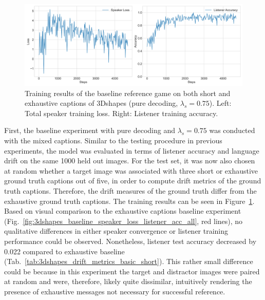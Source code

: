 \begin{figure}[h]
	\centering
	\includegraphics[width=\linewidth]{images/3dshapes_wShort_baseline_random_075_losses.png}
	\caption{Training results of the baseline reference game on both short and exhaustive captions of 3Dshapes (pure decoding, $\lambda_s=0.75$). Left: Total speaker training loss. Right: Listener training accuracy.}
	\label{fig:3dshapes_wShort_075_speaker_losses_listener_acc}
\end{figure}

First, the baseline experiment with pure decoding and $\lambda_s = 0.75$ was conducted with the mixed captions. Similar to the testing procedure in previous experiments, the model was evaluated in terms of listener accuracy and language drift on the same 1000 held out images. For the test set, it was now also chosen at random whether a target image was associated with three short or exhaustive ground truth captions out of five, in order to compute drift metrics of the ground truth captions. Therefore, the drift measures of the ground truth differ from the exhaustive ground truth captions.
The training results can be seen in Figure~\ref{fig:3dshapes_wShort_075_speaker_losses_listener_acc}. Based on visual comparison to the exhaustive captions baseline experiment (Fig.~\ref{fig:3dshapes_baseline_speaker_loss_listener_acc_all}, red lines), no qualitative differences in either speaker convergence or listener training performance could be observed. Nonetheless, listener test accuracy decreased by 0.022 compared to exhaustive baseline (Tab.~\ref{tab:3dshapes_drift_metrics_basic_short}).
This rather small difference could be because in this experiment the target and distractor images were paired at random and were, therefore, likely quite dissimilar, intuitively rendering the presence of exhaustive messages not necessary for successful reference.


